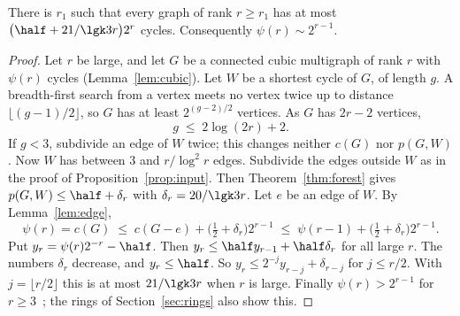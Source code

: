 \begin{corollary}\label{cor:cycles}
There is $r_1$ such that every graph of rank $r\ge r_1$ has at most
$\bigl(\half+21/\lgk3r\bigr)2^{r}$ cycles. Consequently $\psi(r)\sim2^{r-1}$.
\end{corollary}

\begin{proof}
Let $r$ be large, and let $G$ be a connected cubic multigraph of rank $r$ with $\psi(r)$ cycles
(Lemma~\ref{lem:cubic}). Let $W$ be a shortest cycle of $G$, of length $g$. A breadth-first search
from a vertex meets no vertex twice up to distance $\lfloor(g-1)/2\rfloor$, so $G$ has at least
$2^{(g-2)/2}$ vertices. As $G$ has $2r-2$ vertices,
\begin{equation}\label{eq:girthbound}
  g\;\le\;2\log(2r)+2 .
\end{equation}
If $g<3$, subdivide an edge of $W$ twice; this changes neither $c(G)$ nor $p(G,W)$. Now $W$ has
between $3$ and $r/\log^{2}r$ edges. Subdivide the edges outside $W$ as in the proof of
Proposition~\ref{prop:input}. Then Theorem~\ref{thm:forest} gives
$p(G,W)\le\half+\delta_r$ with $\delta_r=20/\lgk3r$. Let $e$ be an edge of $W$. By
Lemma~\ref{lem:edge},
\[
  \psi(r)=c(G)\;\le\;c(G-e)+\bigl(\tfrac12+\delta_r\bigr)2^{r-1}
  \;\le\;\psi(r-1)+\bigl(\tfrac12+\delta_r\bigr)2^{r-1}.
\]
Put $y_r=\psi(r)2^{-r}-\half$. Then $y_r\le\half y_{r-1}+\half\delta_r$ for all large $r$. The
numbers $\delta_r$ decrease, and $y_r\le\half$. So $y_r\le2^{-j}y_{r-j}+\delta_{r-j}$ for
$j\le r/2$. With $j=\lfloor r/2\rfloor$ this is at most $21/\lgk3r$ when $r$ is large. Finally
$\psi(r)>2^{r-1}$ for $r\ge3$~\cite{ES}; the rings of Section~\ref{sec:rings} also show this.
\end{proof}
